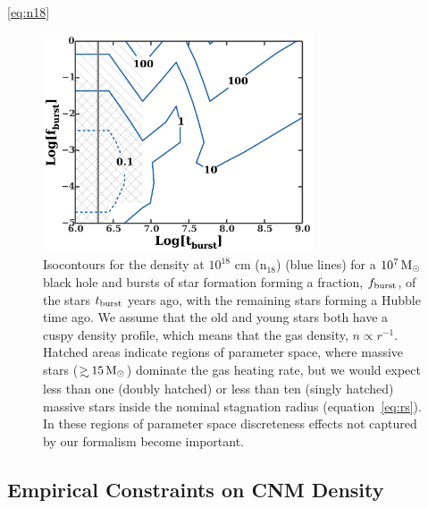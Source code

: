 \documentclass[usenatbib,fleqn]{mnras}
\newcommand\gsim{\mathrel{\rlap{\lower4pt\hbox{\hskip1pt$\sim$}}
    \raise1pt\hbox{$>$}}}
\newcommand{\Msun}{{\rm M_\odot}}
\begin{document}
\ref{eq:n18}
\begin{figure} 
  \includegraphics[width=8cm]{cnm_plot.pdf}
  \caption{\label{fig:param} Isocontours for the density at $10^{18}$
    cm ($\mathrm{n_{18}}$) (blue lines) for a $10^{7} \, \Msun$ black
    hole and bursts of star formation forming a fraction, $f_{\rm
      burst}$, of the stars $t_{\rm burst}$ years ago, with the
    remaining stars forming a Hubble time ago. We assume
    that the old and young stars both have a cuspy density profile,
    which means that the gas density, $n\propto r^{-1}$.
    Hatched areas indicate regions of parameter space, where massive
    stars ($\gsim 15 \, \Msun$) dominate the gas heating rate, but we
    would expect less than one (doubly hatched) or less than ten
    (singly hatched) massive stars inside the nominal stagnation
    radius (equation~\ref{eq:rs}). In these regions of parameter
    space discreteness effects not captured by our formalism become
    important.}
\end{figure}



\subsection{Empirical Constraints on CNM Density}
\label{sec:empirical}
\end{document}
